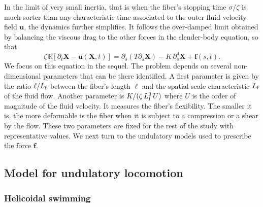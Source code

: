 \documentclass[aps,pre,reprint,superscriptaddress]{revtex4-2}
\newcommand{\bX}{\bm X}
\newcommand{\bu}{\bm u}
\newcommand{\bF}{\bm f}
\begin{document}
In the limit of very small inertia, that is when the fiber's stopping time $\sigma/\zeta$ is much sorter than any characteristic time associated to the outer fluid velocity field $\bu$, the dynamics further simplifies. It follows the over-damped limit obtained by balancing the viscous drag to the other forces in the slender-body equation, so that
\begin{equation}
  \zeta\,\mathbb{R}\left[\partial_t \bX-\bu(\bX,t)\right] = \partial_s(T\partial_s \bX) - K\,\partial_s^4 \bX + \bF(s,t).
  \label{eq:vel_fib}
\end{equation}
We focus on this equation in the sequel.
The problem depends on several non-dimensional parameters that can be there identified. A first parameter is given by the ratio $\ell/L_{\rm f}$ between the fiber's length $\ell$ and the spatial scale characteristic $L_{\rm f}$ of the fluid flow. Another parameter is ${K}/({\zeta\,L_{\rm f}^{3}\,U})$ where $U$ is the order of magnitude of the fluid velocity. It measures the fiber's flexibility. The smaller it is, the more deformable is the fiber when it is subject to a compression or a shear by the flow. These two parameters are fixed for the rest of the study with representative values. We next turn to the undulatory models used to prescribe the force $\bF$.


\subsection{Model for undulatory locomotion}

\subsubsection{Helicoidal swimming}
\end{document}
